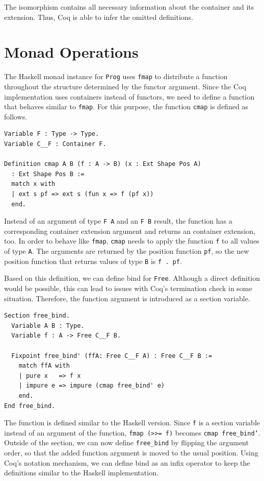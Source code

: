 \documentclass[a4paper, 11pt, fleqn, twoside, abstract=on]{scrreprt}
\newcommand{\hinl}[1]{\texttt{#1}}
\newcommand{\cinl}[1]{\texttt{#1}}
\begin{document}
The isomorphism contains all necessary information about the container and its extension.
Thus, Coq is able to infer the omitted definitions.

\section{Monad Operations}
The Haskell monad instance for \hinl{Prog} uses \hinl{fmap} to distribute a function throughout the structure determined by the functor argument.
Since the Coq implementation uses containers instead of functors, we need to define a function that behaves similar to \hinl{fmap}.
For this purpose, the function \cinl{cmap} is defined as follows.

\begin{verbatim}
Variable F : Type -> Type.
Variable C__F : Container F.

Definition cmap A B (f : A -> B) (x : Ext Shape Pos A) 
  : Ext Shape Pos B :=
  match x with
  | ext s pf => ext s (fun x => f (pf x))
  end.
\end{verbatim}

Instead of an argument of type \cinl{F A} and an \cinl{F B} result, the function has a corresponding container extension argument and returns an container extension, too.
In order to behave like \hinl{fmap}, \cinl{cmap} needs to apply the function \cinl{f} to all values of type \cinl{A}.
The arguments are returned by the position function \cinl{pf}, so the new position function that returns values of type \cinl{B} is \cinl{f . pf}.

Based on this definition, we can define bind for \cinl{Free}.
Although a direct definition would be possible, this can lead to issues with Coq's termination check in some situation.
Therefore, the function argument is introduced as a section variable.

\begin{verbatim}
Section free_bind.
  Variable A B : Type.
  Variable f : A -> Free C__F B.

  Fixpoint free_bind' (ffA: Free C__F A) : Free C__F B :=
    match ffA with
    | pure x   => f x
    | impure e => impure (cmap free_bind' e)
    end.
End free_bind.
\end{verbatim}

The function is defined similar to the Haskell version.
Since \cinl{f} is a section variable instead of an argument of the function, \hinl{fmap (>>= f)} becomes \cinl{cmap free_bind'}.
Outside of the section, we can now define \cinl{free_bind} by flipping the argument order, so that the added function argument is moved to the usual position.
Using Coq's notation mechanism, we can define bind as an infix operator to keep the definitions similar to the Haskell implementation.
\end{document}

